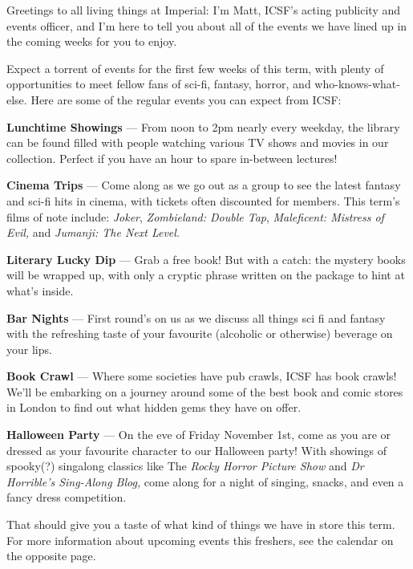 Greetings to all living things at Imperial: I’m Matt, ICSF’s acting
publicity and events officer, and I’m here to tell you about all of
the events we have lined up in the coming weeks for you to enjoy.

Expect a torrent of events for the first few weeks of this term, with
plenty of opportunities to meet fellow fans of sci-fi, fantasy,
horror, and who-knows-what-else.  Here are some of the regular events
you can expect from ICSF:

\textbf{Lunchtime Showings} ---
From noon to 2pm nearly every weekday, the library can be found filled
with people watching various TV shows and movies in our
collection. Perfect if you have an hour to spare in-between lectures!

\textbf{Cinema Trips} ---
Come along as we go out as a group to see the latest fantasy and
sci-fi hits in cinema, with tickets often discounted for members. This
term’s films of note include: \textit{Joker}, \textit{Zombieland:
Double Tap}, \textit{Maleficent: Mistress of Evil,}
and \textit{Jumanji: The Next Level.}

\textbf{Literary Lucky Dip} ---
Grab a free book! But with a catch: the mystery books will be wrapped
up, with only a cryptic phrase written on the package to hint at
what’s inside.

\textbf{Bar Nights} ---
First round’s on us as we discuss all things sci fi and fantasy with
the refreshing taste of your favourite (alcoholic or otherwise)
beverage on your lips.

\textbf{Book Crawl} ---
Where some societies have pub crawls, ICSF has book crawls! We’ll be
embarking on a journey around some of the best book and comic stores
in London to find out what hidden gems they have on offer.

\textbf{Halloween Party} ---
On the eve of Friday November 1st, come as you are or dressed as your
favourite character to our Halloween party!  With showings of
spooky(?) singalong classics like The \textit{Rocky Horror Picture
Show} and \textit{Dr Horrible’s Sing-Along Blog,} come along for a
night of singing, snacks, and even a fancy dress competition.

That should give you a taste of what kind of things we have in store
this term. For more information about upcoming events this freshers,
see the calendar on the opposite page.
